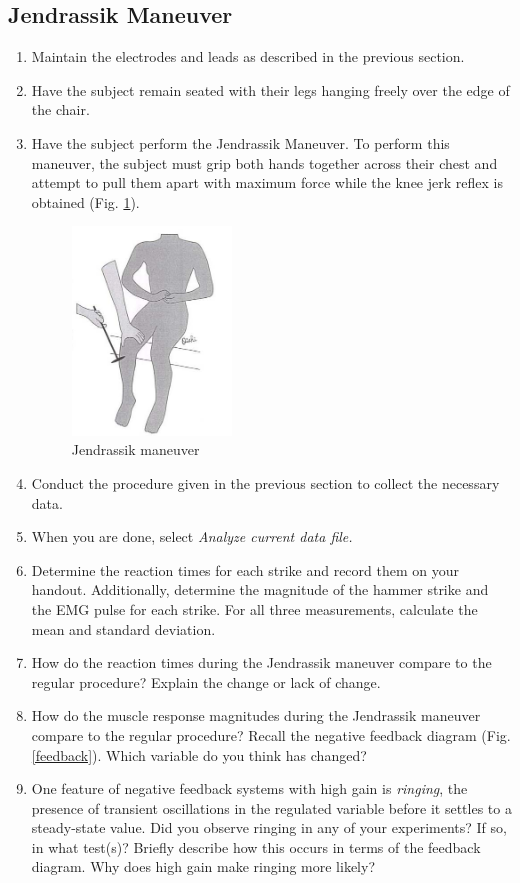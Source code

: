 \documentclass{article}
\begin{document}
\subsection*{Jendrassik Maneuver}
\begin{enumerate}
	\item Maintain the electrodes and leads as described in the previous section.
	\item Have the subject remain seated with their legs hanging freely over the edge of the chair.
	\item Have the subject perform the Jendrassik Maneuver. To perform this maneuver, the subject must grip both hands together across their chest and attempt to pull them apart with maximum force while the knee jerk reflex is obtained (Fig. \ref{jendrassik}).
	
		\begin{figure}[h]
		\centering
		\includegraphics[width=0.4\textwidth]{../images/EMG_II_8.jpg}	
		\caption{Jendrassik maneuver}
		\label{jendrassik}
		\end{figure}

	\item Conduct the procedure given in the previous section to collect the necessary data.
	\item When you are done, select \textit{Analyze current data file.}
	\item Determine the reaction times for each strike and record them on your handout. Additionally, determine the magnitude of the hammer strike and the EMG pulse for each strike. For all three measurements, calculate the mean and standard deviation.
	\item How do the reaction times during the Jendrassik maneuver compare to the regular procedure? Explain the change or lack of change.
	\item How do the muscle response magnitudes during the Jendrassik maneuver compare to the regular procedure? Recall the negative feedback diagram (Fig. \ref{feedback}). Which variable do you think has changed?
	\item One feature of negative feedback systems with high gain is \textit{ringing}, the presence of transient oscillations in the regulated variable before it settles to a steady-state value. Did you observe ringing in any of your experiments? If so, in what test(s)? Briefly describe how this occurs in terms of the feedback diagram. Why does high gain make ringing more likely?
\end{enumerate}
\end{document}
